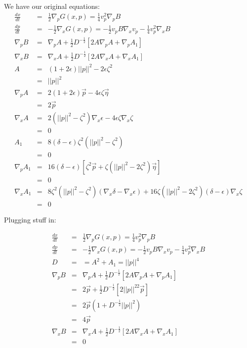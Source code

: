 \documentclass[12pt]{article}
\begin{document}
We have our original equations:
\begin{eqnarray}
\frac{dx}{dt}   &=&  \frac{1}{2}\nabla_p G(x,p) =  \frac{1}{4}v_p^2\nabla_pB\\
\frac{dp}{dt}   &=& -\frac{1}{2}\nabla_x G(x,p) = -\frac{1}{2}v_pB\nabla_xv_p-\frac{1}{4}v_p^2\nabla_xB\\
\nabla_p B      &=&  \nabla_p A+\frac{1}{2}D^{-\frac{1}{2}}\left[2A\nabla_p A + \nabla_p A_1\right]\\
\nabla_x B      &=&  \nabla_x A+\frac{1}{2}D^{-\frac{1}{2}}\left[2A\nabla_x A + \nabla_x A_1\right]\\
A               &=&  (1+2\epsilon)||p||^2-2\epsilon\zeta^2 \\
                &=&  ||p||^2 \\
\nabla_p A      &=&  2(1+2\epsilon)\vec{p}-4\epsilon\zeta\vec{\eta}\\
                &=&  2\vec{p}\\
\nabla_x A      &=&  2(||p||^2-\zeta^2)\nabla_x \epsilon - 4\epsilon\zeta\nabla_x \zeta\\
                &=&  0\\
A_1             &=&  8(\delta-\epsilon)\zeta^2(||p||^2-\zeta^2) \\
                &=&  0 \\
\nabla_p A_1    &=&  16(\delta-\epsilon)\left[\zeta^2\vec{p}+\zeta(||p||^2-2\zeta^2)\vec{\eta}\right]\\
                &=&  0\\
\nabla_x A_1    &=&  8\zeta^2(||p||^2-\zeta^2)(\nabla_x \delta - \nabla_x \epsilon) + 16\zeta(||p||^2-2\zeta^2)(\delta-\epsilon)\nabla_x \zeta \nonumber\\
                &=&  0 \nonumber
\end{eqnarray}

Plugging stuff in:

\begin{eqnarray}
\frac{dx}{dt}   &=&  \frac{1}{2}\nabla_p G(x,p) =  \frac{1}{4}v_p^2\nabla_pB\\
\frac{dp}{dt}   &=& -\frac{1}{2}\nabla_x G(x,p) = -\frac{1}{2}v_pB\nabla_xv_p-\frac{1}{4}v_p^2\nabla_xB\\
D               &=&  =A^2+A_1=||p||^4\\
\nabla_p B      &=&  \nabla_p A+\frac{1}{2}D^{-\frac{1}{2}}\left[2A\nabla_p A + \nabla_p A_1\right]\\
                &=&  2\vec{p}+\frac{1}{2}D^{-\frac{1}{2}}\left[2||p||^22\vec{p}\right]\\
                &=&  2\vec{p}(1+D^{-\frac{1}{2}}||p||^2)\\
                &=&  4\vec{p}\\
\nabla_x B      &=&  \nabla_x A+\frac{1}{2}D^{-\frac{1}{2}}\left[2A\nabla_x A + \nabla_x A_1\right]\\
                &=&  0
\end{eqnarray}
\end{document}
